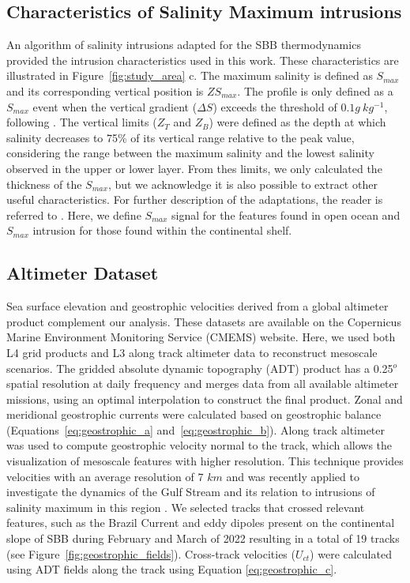 \documentclass[draft]{agujournal2019}
\begin{document}
\subsection{Characteristics of Salinity Maximum intrusions}
\label{sec:smax_structure}

An algorithm of salinity intrusions \cite{Lentz2003} adapted for the SBB thermodynamics \cite{silva2023inventory} provided the intrusion characteristics used in this work. These characteristics are illustrated in Figure~\ref{fig:study_area} c. The maximum salinity is defined as \textit{$S_{max}$} and its corresponding vertical position is $ZS_{max}$. The profile is only defined as a \textit{$S_{max}$} event when the vertical gradient ($\Delta{S}$) exceeds the threshold of $0.1 g\ kg^{-1}$, following . The vertical limits ($Z_{T}$ and $Z_{B}$) were defined as the depth at which salinity decreases to 75\% of its vertical range relative to the peak value, considering the range between the maximum salinity and the lowest salinity observed in the upper or lower layer. From thes limits, we only calculated the thickness of the \textit{$S_{max}$}, but we acknowledge it is also possible to extract other useful characteristics. For further description of the adaptations, the reader is referred to . Here, we define \textit{$S_{max}$} signal for the features found in open ocean and \textit{$S_{max}$} intrusion for those found within the continental shelf.

\subsection{Altimeter Dataset}
Sea surface elevation and geostrophic velocities derived from a global altimeter product complement our analysis. These datasets are available on the Copernicus Marine Environment Monitoring Service (CMEMS) website. Here, we used both L4 grid products \cite{cmems_l4_ssh_nrt} and L3 along track altimeter data \cite{cmems_l3_ssh_reprocessed} to reconstruct mesoscale scenarios. The gridded absolute dynamic topography (ADT) product has a 0.25$^o$ spatial resolution at daily frequency and merges data from all available altimeter missions, using an optimal interpolation to construct the final product. Zonal and meridional geostrophic currents were calculated based on geostrophic balance (Equations~\ref{eq:geostrophic_a} and~\ref{eq:geostrophic_b}). Along track altimeter was used to compute geostrophic velocity normal to the track, which allows the visualization  of mesoscale features with higher resolution. This technique provides velocities with an average resolution of 7 $km$ and was recently applied to investigate the dynamics of the Gulf Stream and its relation to intrusions of salinity maximum in this region \cite{silver2022spatial}. We selected tracks that crossed relevant features, such as the Brazil Current and eddy dipoles present on the continental slope of SBB during February and March of 2022 resulting in a total of 19 tracks (see Figure~\ref{fig:geostrophic_fields}). Cross-track velocities ($U_{ct}$) were calculated using ADT fields along the track using Equation \ref{eq:geostrophic_c}.
\end{document}
